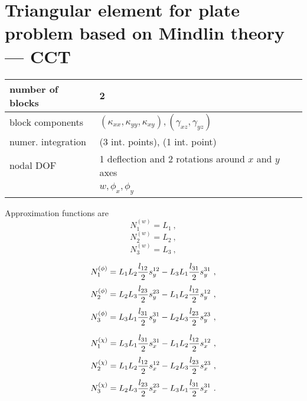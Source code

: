 \section{Triangular element for plate problem ba\-sed on Mindlin theory --- CCT}
\label{sectcctelem}

\begin{tabular}{|l|l|}
\hline
number of blocks & 2
\\ \hline
block components & $(\kappa_{xx},\kappa_{yy},\kappa_{xy}), (\gamma_{xz},\gamma_{yz})$
\\ \hline
numer. integration & (3 int. points), (1 int. point)
\\ \hline
nodal DOF & 1 deflection and 2 rotations around $x$ and $y$ axes
\\ \cline{2-2}
 & $w, \phi_x, \phi_y$
\\ \hline
\end{tabular}

Approximation functions are
\begin{equation}
N_1^{(w)} = L_1\ ,
\end{equation}
\begin{equation}
N_2^{(w)} = L_2\ ,
\end{equation}
\begin{equation}
N_3^{(w)} = L_3\ ,
\end{equation}

\begin{equation}
N_1^{(\phi)} = L_1 L_2 \mbox{$\displaystyle\frac{l_{12}}{2}$}s_y^{12} - L_3 L_1 \mbox{$\displaystyle\frac{l_{31}}{2}$}s_y^{31}\ ,
\end{equation}
\begin{equation}
N_2^{(\phi)} = L_2 L_3 \mbox{$\displaystyle\frac{l_{23}}{2}$}s_y^{23} - L_1 L_2 \mbox{$\displaystyle\frac{l_{12}}{2}$}s_y^{12}\ ,
\end{equation}
\begin{equation}
N_3^{(\phi)} = L_3 L_1 \del{l_{31}}{2}s_y^{31} - L_2 L_3 \del{l_{23}}{2}s_y^{23}\ ,
\end{equation}

\begin{equation}
N_1^{(\chi)} = L_3 L_1 \mbox{$\displaystyle\frac{l_{31}}{2}$}s_x^{31} - L_1 L_2 \mbox{$\displaystyle\frac{l_{12}}{2}$}s_x^{12}\ ,
\end{equation}
\begin{equation}
N_2^{(\chi)} = L_1 L_2 \mbox{$\displaystyle\frac{l_{12}}{2}$}s_x^{12} - L_2 L_3 \mbox{$\displaystyle\frac{l_{23}}{2}$}s_x^{23}\ ,
\end{equation}
\begin{equation}
N_3^{(\chi)} = L_2 L_3 \del{l_{23}}{2}s_x^{23} - L_3 L_1 \del{l_{31}}{2}s_x^{31}\ .
\end{equation}

